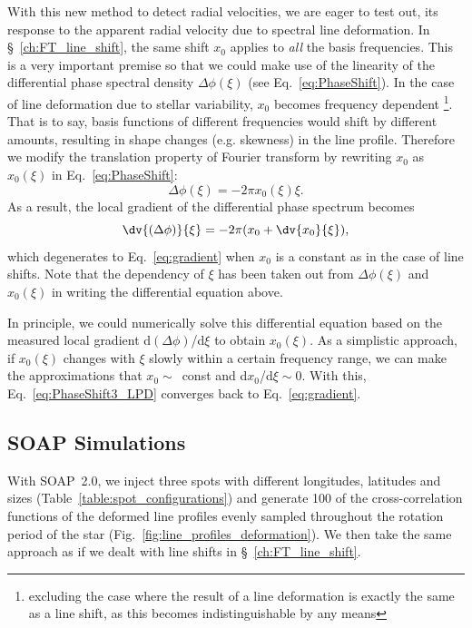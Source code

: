 With this new method to detect radial velocities, we are eager to test out, its response to 
the apparent radial velocity due to spectral line deformation. In \S~\ref{ch:FT_line_shift},
the same shift $x_0$ applies to \textit{all} the basis frequencies. This is a very important premise so that 
we could make use of the linearity of the differential phase spectral density $\Delta \phi(\xi)$ (see Eq.~\ref{eq:PhaseShift}). 
In the case of line deformation due to stellar variability, $x_0$ becomes frequency dependent 
\footnote{excluding the case where the result of a line deformation is exactly the same as a line shift, as 
this becomes indistinguishable by any means}. That is to say, basis functions of different frequencies would 
shift by different amounts, resulting in shape changes (e.g. skewness) in the line profile. 
Therefore we modify the translation property of Fourier transform
by rewriting $x_0$ as $x_0(\xi)$ in Eq.~\ref{eq:PhaseShift}:
\begin{equation}
	\Delta \phi(\xi) = -2 \pi x_0(\xi) \xi.
\label{eq:PhaseShift2_LPD}
\end{equation}
As a result, the local gradient of the differential phase spectrum becomes 
\begin{equation}
	\dv{(\Delta \phi)}{\xi} = -2 \pi (x_0 + \dv{x_0}{\xi}),
\label{eq:PhaseShift3_LPD}
\end{equation}
which degenerates to Eq.~\ref{eq:gradient} when $x_0$ is a constant as in the case of line shifts.
Note that the dependency of $\xi$ has been taken out from $\Delta \phi(\xi)$ and 
$x_0(\xi)$ in writing the differential equation above. 

In principle, we could numerically solve this differential equation based on the measured local gradient d$(\Delta \phi)$/d$\xi$
to obtain $x_0(\xi)$. As a simplistic approach, if $x_0(\xi)$ changes with $\xi$ slowly within a certain frequency range,
we can make the approximations that $x_0\sim$~const and d$x_0$/d$\xi\sim0$. With this, Eq.~\ref{eq:PhaseShift3_LPD} 
converges back to Eq.~\ref{eq:gradient}.

\subsection{SOAP Simulations}
\label{sec:Simulations}


With SOAP~2.0, we inject three spots with different longitudes, latitudes and sizes (Table~\ref{table:spot_configurations}) 
and generate 100 of the cross-correlation functions of the deformed line profiles evenly sampled throughout the rotation
period of the star (Fig.~\ref{fig:line_profiles_deformation}). We then take the same approach as if we dealt with line shifts in 
\S~\ref{ch:FT_line_shift}. 

